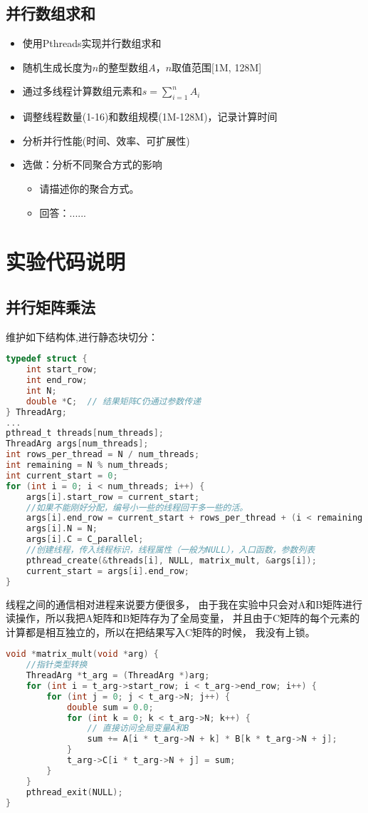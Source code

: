 \documentclass{SYSUReport}
\begin{document}
\subsection{并行数组求和}
\begin{itemize}
    \item 使用Pthreads实现并行数组求和
    \item 随机生成长度为$n$的整型数组$A$，$n$取值范围[1M, 128M]
    \item 通过多线程计算数组元素和$s = \sum_{i=1}^{n}A_i$
    \item 调整线程数量(1-16)和数组规模(1M-128M)，记录计算时间
    \item 分析并行性能(时间、效率、可扩展性)
    \item 选做：分析不同聚合方式的影响
     \begin{itemize}
        \item 请描述你的聚合方式。
        \item 回答：......
    \end{itemize}
\end{itemize}
\section{实验代码说明}
\subsection{并行矩阵乘法}
维护如下结构体,进行静态块切分：
\begin{lstlisting}[language=c]
typedef struct {
    int start_row;
    int end_row;
    int N;
    double *C;  // 结果矩阵C仍通过参数传递
} ThreadArg;
...
pthread_t threads[num_threads];
ThreadArg args[num_threads];
int rows_per_thread = N / num_threads;
int remaining = N % num_threads;
int current_start = 0;
for (int i = 0; i < num_threads; i++) {
    args[i].start_row = current_start;
    //如果不能刚好分配，编号小一些的线程回干多一些的活。
    args[i].end_row = current_start + rows_per_thread + (i < remaining ? 1 : 0);
    args[i].N = N;
    args[i].C = C_parallel;
    //创建线程，传入线程标识，线程属性（一般为NULL），入口函数，参数列表
    pthread_create(&threads[i], NULL, matrix_mult, &args[i]);
    current_start = args[i].end_row;
}
\end{lstlisting}
线程之间的通信相对进程来说要方便很多，
由于我在实验中只会对A和B矩阵进行读操作，所以我把A矩阵和B矩阵存为了全局变量，
并且由于C矩阵的每个元素的计算都是相互独立的，所以在把结果写入C矩阵的时候，
我没有上锁。
\begin{lstlisting}[language=c]
void *matrix_mult(void *arg) {
    //指针类型转换
    ThreadArg *t_arg = (ThreadArg *)arg;
    for (int i = t_arg->start_row; i < t_arg->end_row; i++) {
        for (int j = 0; j < t_arg->N; j++) {
            double sum = 0.0;
            for (int k = 0; k < t_arg->N; k++) {
                // 直接访问全局变量A和B
                sum += A[i * t_arg->N + k] * B[k * t_arg->N + j];
            }
            t_arg->C[i * t_arg->N + j] = sum;
        }
    }
    pthread_exit(NULL);
}
\end{lstlisting}
\end{document}
